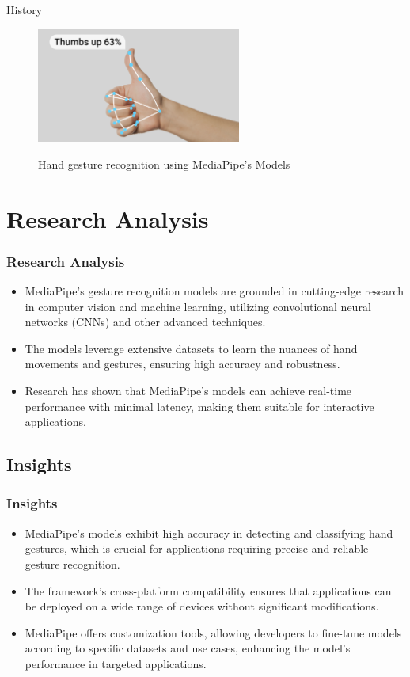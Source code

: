 \documentclass[aspectratio=169, hideothersubsections]{beamer}
\begin{document}
\begin{frame}{History}
\begin{figure}
  \centering
  \includegraphics[width=0.6\textwidth]{key2.png}
  \label{fig:example}
  \caption{Hand gesture recognition using MediaPipe's Models}
\end{figure}
\end{frame}

\section{Research Analysis}
\begin{frame}
    \frametitle{Research Analysis}
    \begin{itemize}
        \item MediaPipe's gesture recognition models are grounded in cutting-edge research in computer vision and machine learning, utilizing convolutional neural networks (CNNs) and other advanced techniques.
        \item The models leverage extensive datasets to learn the nuances of hand movements and gestures, ensuring high accuracy and robustness.
        \item Research has shown that MediaPipe's models can achieve real-time performance with minimal latency, making them suitable for interactive applications.
    \end{itemize}
\end{frame}

\subsection{Insights}
\begin{frame}
    \frametitle{Insights}
    \begin{itemize}
        \item MediaPipe's models exhibit high accuracy in detecting and classifying hand gestures, which is crucial for applications requiring precise and reliable gesture recognition.
        \item The framework's cross-platform compatibility ensures that applications can be deployed on a wide range of devices without significant modifications.
        \item MediaPipe offers customization tools, allowing developers to fine-tune models according to specific datasets and use cases, enhancing the model's performance in targeted applications.
    \end{itemize}
\end{frame}
\end{document}

